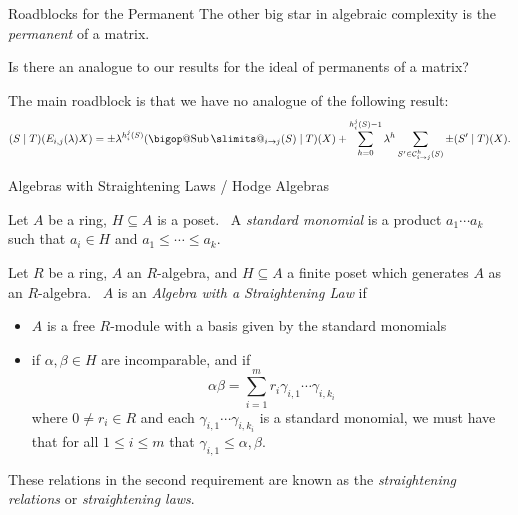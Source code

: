 \documentclass[aspectratio=169]{beamer}
\makeatletter
\DeclareRobustCommand\bigop[1]{%
  \mathop{\vphantom{\cdot}\mathpalette\bigop@{#1}}\slimits@
}
\newcommand{\bigop@}[2]{%
  \vcenter{%
    \sbox\z@{$#1\sum$}%
    \hbox{\resizebox{\ifx#1\displaystyle.9\fi\dimexpr\ht\z@+\dp\z@}{!}{$\m@th#2$}}%
  }%
}
\newcommand{\Sub}{\DOTSB\bigop{\mathrm{Sub}}}
\makeatother
\begin{document}
\begin{frame}{Roadblocks for the Permanent}
    The other big star in algebraic complexity is the \emph{permanent} of a matrix.
    
    \pause
    \vspace{20pt}
    
    \begin{question}
        Is there an analogue to our results for the ideal of permanents of a matrix?
    \end{question}

    \pause
    \vspace{20pt}

    The main roadblock is that we have no analogue of the following result:
    \[
        (S \mid T)(E_{i, j}(\lambda)X) = \pm \lambda^{h_{i}^{j}(S)} (\Sub_{i \to j}(S) \mid T)(X) + \sum_{h = 0}^{h_{i}^{j}(S) - 1} \lambda^h \sum_{S' \in \mathcal{C}^{h}_{i \to j}(S)} \pm  (S' \mid T)(X).
    \]
\end{frame}

\begin{frame}{Algebras with Straightening Laws / Hodge Algebras}
  \begin{defn}
    Let $A$ be a ring, $H \subseteq A$ is a poset.\ \pause
    A \emph{standard monomial} is a product $a_1 \cdots a_k$ such that $a_i \in H$ and $a_1 \leq \cdots \leq a_k$.\ \pause

    Let $R$ be a ring, $A$ an $R$-algebra, and $H \subseteq A$ a finite poset which generates $A$ as an $R$-algebra.\ \pause
    $A$ is an \emph{Algebra with a Straightening Law} if \pause
    \begin{itemize}
    \item $A$ is a free $R$-module with a basis given by the standard monomials \pause
    \item if $\alpha, \beta \in H$ are incomparable, and if
          \[
          \alpha \beta = \sum_{i = 1}^m r_i \gamma_{i, 1} \cdots  \gamma_{i, k_i}
          \]
          where $0 \neq r_i \in R$ and each $\gamma_{i, 1} \cdots  \gamma_{i, k_i}$ is a standard monomial, we must have that for all $1 \leq i \leq m$ that $\gamma_{i, 1} \leq \alpha, \beta$.\ \pause
    \end{itemize}
    These relations in the second requirement are known as the \emph{straightening relations} or \emph{straightening laws}.
  \end{defn}
\end{frame}
\end{document}
